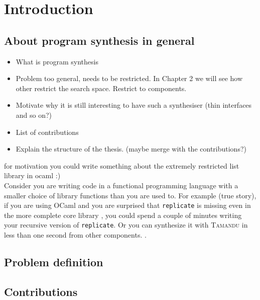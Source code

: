 \newcommand{\package}{\emph}

\chapter{Introduction}\label{ch:introduction}

\section{About program synthesis in general}

\begin{itemize}
\item What is program synthesis
\item Problem too general, needs to be restricted. In Chapter 2 we will see how other restrict the search space. Restrict to components.
\item Motivate why it is still interesting to have such a synthesiser (thin interfaces and so on?)
\item List of contributions
\item Explain the structure of the thesis. (maybe merge with the contributions?)
\end{itemize}

for motivation you could write something about the extremely restricted list library in ocaml :)\\
Consider you are writing code in a functional programming language with a smaller choice of library functions than you are used to. For example (true story), if you are using OCaml and you are surprised that \lstinline?replicate? is missing even in the more complete core library , you could spend a couple of minutes writing your recursive version of \lstinline?replicate?. Or you can synthesize it with \textsc{Tamandu} in less than one second from other components. .


\section{Problem definition}
  
\section{Contributions}
